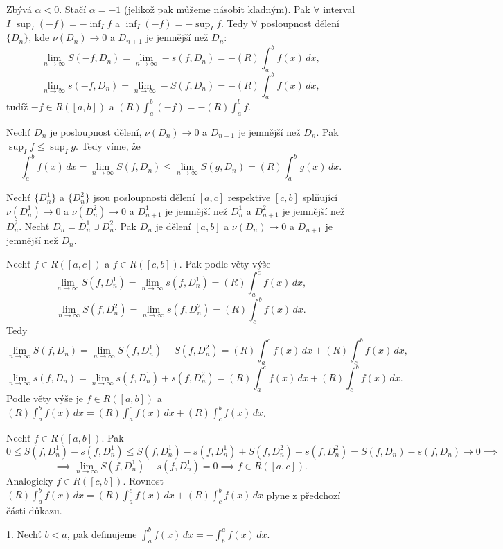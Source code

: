 \documentclass[12pt]{article}                   %
\begin{document}
\begin{veta}
\begin{dukazin}[a]
                Zbývá $\alpha < 0$. Stačí $\alpha = -1$ (jelikož pak můžeme násobit kladným). Pak $\forall$ interval $I$ $\sup_I (-f) = -\inf_I f$ a $\inf_I(-f) = -\sup_I f$. Tedy $\forall$ posloupnost dělení $\{D_n\}$, kde $\nu(D_n) \rightarrow 0$ a $D_{n+1}$ je jemnější než $D_n$:
                $$ \lim_{n \rightarrow ∞} S(-f, D_n) = \lim_{n \rightarrow ∞} - s(f, D_n) = - (R)\int_a^b f(x)\,dx, $$ 
                $$ \lim_{n \rightarrow ∞} s(-f, D_n) = \lim_{n \rightarrow ∞} - S(f, D_n) = - (R)\int_a^b f(x)\,dx, $$
                tudíž $-f \in R([a, b])$ a $(R)\int_a^b (-f) = -(R)\int_a^b f$.
            \end{dukazin}

            \begin{dukazin}[b]
                Nechť $D_n$ je posloupnost dělení, $\nu(D_n) \rightarrow 0$ a $D_{n+1}$ je jemnější než $D_n$. Pak $\sup_I f ≤ \sup_I g$. Tedy víme, že
                $$ \int_a^b f(x)\,dx = \lim_{n \rightarrow ∞} S(f, D_n) ≤ \lim_{n \rightarrow ∞} S(g, D_n) = (R)\int_a^b g(x)\,dx. $$
            \end{dukazin}

            \begin{dukazin}[c]
                Nechť $\{D_n^1\}$ a $\{D_n^2\}$ jsou posloupnosti dělení $[a, c]$ respektive $[c, b]$ splňující $\nu(D_n^1) \rightarrow 0$ a $\nu(D_n^2) \rightarrow 0$ a $D^1_{n+1}$ je jemnější než $D^1_n$ a $D^2_{n+1}$ je jemnější než $D^2_n$. Nechť $D_n = D_n^1 \cup D_n^2$. Pak $D_n$ je dělení $[a, b]$ a $\nu(D_n) \rightarrow 0$ a $D_{n+1}$ je jemnější než $D_n$.

                Nechť $f\in R([a, c])$ a $f \in R([c, b])$. Pak podle věty výše
                $$ \lim_{n \rightarrow ∞} S(f, D_n^1) = \lim_{n \rightarrow ∞} s(f, D_n^1) = (R)\int_a^c f(x)\,dx, $$
                $$ \lim_{n \rightarrow ∞} S(f, D_n^2) = \lim_{n \rightarrow ∞} s(f, D_n^2) = (R)\int_c^b f(x)\,dx. $$
                Tedy
                $$ \lim_{n \rightarrow ∞} S(f, D_n) = \lim_{n \rightarrow ∞} S(f, D_n^1) + S(f, D_n^2) = (R) \int_a^c f(x)\,dx + (R)\int_c^b f(x)\,dx, $$
                $$ \lim_{n \rightarrow ∞} s(f, D_n) = \lim_{n \rightarrow ∞} s(f, D_n^1) + s(f, D_n^2) = (R) \int_a^c f(x)\,dx + (R)\int_c^b f(x)\,dx. $$
                Podle věty výše je $f \in R([a, b])$ a $(R) \int_a^b f(x)\,dx = (R) \int_a^c f(x)\,dx + (R)\int_c^b f(x)\,dx$.

                Nechť $f \in R([a, b])$. Pak
                $$ 0 ≤ S(f, D_n^1) - s(f, D_n^1) ≤ S(f, D_n^1) - s(f, D_n^1) + S(f, D_n^2) - s(f, D_n^2) = S(f, D_n) - s(f, D_n) \rightarrow 0 \implies $$ 
                $$ \implies \lim_{n \rightarrow ∞} S(f, D_n^1) - s(f, D_n^1) = 0 \implies f \in R([a, c]). $$
                Analogicky $f \in R([c, b])$. Rovnost $(R) \int_a^b f(x)\,dx = (R) \int_a^c f(x)\,dx + (R) \int_c^b f(x)\,dx$ plyne z předchozí části důkazu.
            \end{dukazin}
        \end{veta}

        \begin{poznamka}[Úmluva]
            1. Nechť $b < a$, pak definujeme $\int_a^b f(x)\,dx = - \int_b^a f(x)\,dx$.
        \end{poznamka}
\end{document}
